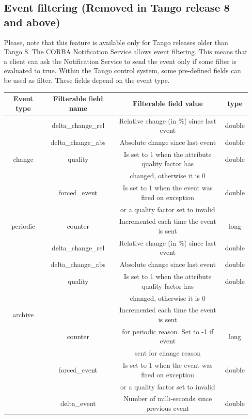 \subsection{Event filtering (Removed in Tango release 8 and above)}

Please, note that this feature is available only for Tango releases
older than Tango 8. The CORBA Notification Service allows event filtering.
This means that a client can ask the Notification Service to send
the event only if some filter is evaluated to true. Within the Tango
control system, some pre-defined fields can be used as filter. These
fields depend on the event type.

\vspace{0.3cm}


\begin{center}
\begin{longtable}{|c|c|c|c|}
\hline 
Event type & Filterable field name & Filterable field value & type\tabularnewline
\hline 
\hline 
 & delta\_change\_rel & Relative change (in \%) since last event & double\tabularnewline
\cline{2-4} 
\multicolumn{1}{|c|}{} & delta\_change\_abs & Absolute change since last event & double\tabularnewline
\cline{2-4} 
\multicolumn{1}{|c|}{change} & quality & Is set to 1 when the attribute quality factor has & double\tabularnewline
\multicolumn{1}{|c|}{} &  & changed, otherwise it is 0 & \tabularnewline
\cline{2-4} 
\multicolumn{1}{|c|}{} & forced\_event & Is set to 1 when the event was fired on exception  & double\tabularnewline
\multicolumn{1}{|c|}{} &  & or a quality factor set to invalid & \tabularnewline
\hline 
periodic & counter & Incremented each time the event is sent & long\tabularnewline
\hline 
\multicolumn{1}{|c|}{} & delta\_change\_rel & Relative change (in \%) since last event & double\tabularnewline
\cline{2-4} 
\multicolumn{1}{|c|}{} & delta\_change\_abs & Absolute change since last event & double\tabularnewline
\cline{2-4} 
 & quality & Is set to 1 when the attribute quality factor has & double\tabularnewline
 &  & changed, otherwise it is 0 & \tabularnewline
\cline{2-4} 
\multicolumn{1}{|c|}{archive} &  & Incremented each time the event is sent & \tabularnewline
\multicolumn{1}{|c|}{} & counter & for periodic reason. Set to -1 if event & long\tabularnewline
\multicolumn{1}{|c|}{} &  & sent for change reason & \tabularnewline
\cline{2-4} 
\multicolumn{1}{|c|}{} & forced\_event & Is set to 1 when the event was fired on exception & double\tabularnewline
\multicolumn{1}{|c|}{} &  & or a quality factor set to invalid & \tabularnewline
\cline{2-4} 
 & delta\_event & Number of milli-seconds since previous event & double\tabularnewline
\hline 
\end{longtable}
\par\end{center}

